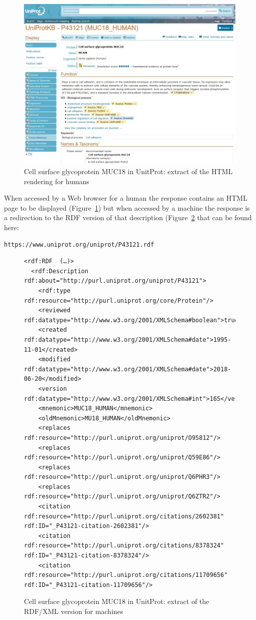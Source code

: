 \begin{figure}
    \centering
    \includegraphics[width=5.0in]{media/ch5/figure-05-05.jpg}
    \caption{Cell surface glycoprotein MUC18 in UnitProt: extract of the HTML
rendering for humans}
    \label{fig:ch5.5}
\end{figure}

When accessed by a Web browser for a human the response contains an HTML
page to be displayed (Figure~\ref{fig:ch5.5}) but when accessed by a machine the
response is a redirection to the RDF version of that description (Figure~\ref{fig:ch5.6} that can be found here:

\begin{lstlisting}
https://www.uniprot.org/uniprot/P43121.rdf
\end{lstlisting}



\begin{figure}
\begin{lstlisting}
<rdf:RDF  (…)>
  <rdf:Description rdf:about="http://purl.uniprot.org/uniprot/P43121">
    <rdf:type rdf:resource="http://purl.uniprot.org/core/Protein"/>
    <reviewed rdf:datatype="http://www.w3.org/2001/XMLSchema#boolean">true</reviewed>
    <created rdf:datatype="http://www.w3.org/2001/XMLSchema#date">1995-11-01</created>
    <modified rdf:datatype="http://www.w3.org/2001/XMLSchema#date">2018-06-20</modified>
    <version rdf:datatype="http://www.w3.org/2001/XMLSchema#int">165</version>
    <mnemonic>MUC18_HUMAN</mnemonic>
    <oldMnemonic>MU18_HUMAN</oldMnemonic>
    <replaces rdf:resource="http://purl.uniprot.org/uniprot/O95812"/>
    <replaces rdf:resource="http://purl.uniprot.org/uniprot/Q59E86"/>
    <replaces rdf:resource="http://purl.uniprot.org/uniprot/Q6PHR3"/>
    <replaces rdf:resource="http://purl.uniprot.org/uniprot/Q6ZTR2"/>
    <citation rdf:resource="http://purl.uniprot.org/citations/2602381" rdf:ID="_P43121-citation-2602381"/>
    <citation rdf:resource="http://purl.uniprot.org/citations/8378324" rdf:ID="_P43121-citation-8378324"/>
    <citation rdf:resource="http://purl.uniprot.org/citations/11709656" rdf:ID="_P43121-citation-11709656"/>
\end{lstlisting}
    \caption{Cell surface glycoprotein MUC18 in UnitProt: extract of the
RDF/XML version for machines}
    \label{fig:ch5.6}
\end{figure}

